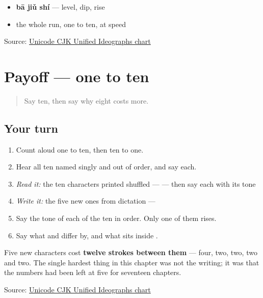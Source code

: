 \begin{itemize}
\raggedright
  \item \textbf{bā jiǔ shí} — level, dip, rise
  \item the whole run, one to ten, at speed
\end{itemize}

\begin{tcolorbox}[breakable,colback=teal!4,colframe=teal!35!black,title={Before you move on}]
Source: \href{https://www.unicode.org/charts/PDF/U4E00.pdf}{Unicode CJK Unified Ideographs chart}
\end{tcolorbox}
\section[Practice]{Payoff — one to ten}

\label{lesson:ZH-C20-practice}



\begin{quote}
Say ten, then say why eight costs more.
\end{quote}

\subsection*{Your turn}
\begin{enumerate}
\raggedright
  \item Count aloud one to ten, then ten to one.
  \item Hear all ten named singly and out of order, and say each.
  \item \emph{Read it:} the ten characters printed shuffled —           — then say each with its tone
  \item \emph{Write it:} the five new ones from dictation —     
  \item Say the tone of each of the ten in order. Only one of them rises.
  \item Say what  and  differ by, and what sits inside .
\end{enumerate}

Five new characters cost \textbf{twelve strokes between them} — four, two, two, two and two. The single hardest thing in this chapter was not the writing; it was that the numbers had been left at five for seventeen chapters.

\begin{tcolorbox}[breakable,colback=teal!4,colframe=teal!35!black,title={Before you move on}]
Source: \href{https://www.unicode.org/charts/PDF/U4E00.pdf}{Unicode CJK Unified Ideographs chart}
\end{tcolorbox}
